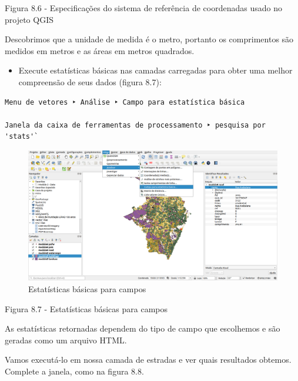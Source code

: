 \documentclass[
]{book}
\providecommand{\tightlist}{%
  \setlength{\itemsep}{0pt}\setlength{\parskip}{0pt}}
\begin{document}
Figura 8.6 - Especificações do sistema de referência de coordenadas usado no projeto QGIS

Descobrimos que a unidade de medida é o metro, portanto os comprimentos são medidos em metros e as áreas em metros quadrados.

\begin{itemize}
\tightlist
\item
  Execute estatísticas básicas nas camadas carregadas para obter uma melhor compreensão de seus dados (figura 8.7):
\end{itemize}

\begin{verbatim}
Menu de vetores ‣ Análise ‣ Campo para estatística básica

Janela da caixa de ferramentas de processamento ‣ pesquisa por 'stats'`
\end{verbatim}

\begin{figure}
\centering
\includegraphics{media/modulo8/fig87.png}
\caption{Estatísticas básicas para campos}
\end{figure}

Figura 8.7 - Estatísticas básicas para campos

As estatísticas retornadas dependem do tipo de campo que escolhemos e são geradas como um arquivo HTML.

Vamos executá-lo em nossa camada de estradas e ver quais resultados obtemos. Complete a janela, como na figura 8.8.
\end{document}
